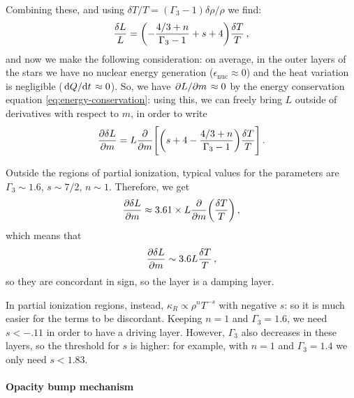 \documentclass[main.tex]{subfiles}
\begin{document}
Combining these, and using \(\delta T / T = (\Gamma_3 -1 ) \delta \rho / \rho \) we find: 
%
\begin{align}
\frac{ \delta L}{L }= \qty(-\frac{4/3 +n}{\Gamma_3 -1} + s+4) \frac{ \delta T}{T}
\,,
\end{align}
%
and now we make the following consideration: on average, in the outer layers of the stars we have no nuclear energy generation (\(\epsilon _{\text{nuc}} \approx 0\)) and the heat variation is negligible (\(\dv*{Q}{t}\approx 0 \)). So, we have \(\pdv*{L}{m} \approx 0\) by the energy conservation equation \eqref{eq:energy-conservation}: using this, we can freely bring \(L\) outside of derivatives with respect to \(m\), in order to write 
%
\begin{align}
\pdv{ \delta L}{m} = L \pdv{}{m} \qty[\qty(s+4- \frac{4/3 +n}{\Gamma_3 -1}) \frac{ \delta T}{T}]
\,.
\end{align}

Outside the regions of partial ionization, typical values for the parameters are \(\Gamma_3 \sim 1.6\), \(s \sim 7/2\), \(n \sim 1\). Therefore, we get 
%
\begin{align}
\pdv{ \delta L}{m} \approx \num{3.61} \times L \pdv{}{m} \qty(\frac{ \delta T}{T})
\,,
\end{align}
%
which means that 
%
\begin{align}
\pdv{ \delta L}{m} \sim 3.6 L \frac{ \delta T}{T}
\,,
\end{align}
%
so they are concordant in sign, so the layer is a damping layer. 


In partial ionization regions, instead, \(\kappa _R \propto \rho^{n}T^{-s}\) with negative \(s\): so it is much easier for the terms to be discordant. Keeping \(n =1\) and \(\Gamma_3 = 1.6  \), we need \(s < \num{-.11}\) in order to have a driving layer. However, \(\Gamma_3\) also decreases in these layers, so the threshold for \(s\) is higher: for example, with \(n=1\) and \(\Gamma_3 = 1.4\) we only need \(s < \num{1.83}\). 


\paragraph{Opacity bump mechanism}
\end{document}
